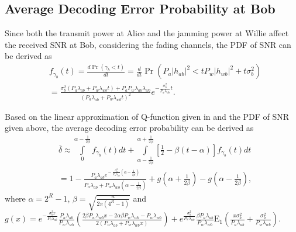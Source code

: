 \documentclass[conference]{IEEEtran}
\begin{document}
\subsection{Average Decoding Error Probability at Bob}
Since both the transmit power at Alice and the jamming power at Willie affect the received SNR at Bob, considering the fading channels, the PDF of SNR can be derived as
\begin{equation}
	\begin{aligned}
		 &{f_{{\gamma _b}}}\!(t)\!\!=\!\! \frac{{d\Pr \!\left(\! {{\gamma _b} \!\!<\! t} \right)}}{{dt}} \!\!=\!\! \frac{d}{{dt}}\Pr \!\left(\! {{P_a}{{\left| {{h_{ab}}} \right|}^2} \!\!<\! t{P_w}{{\left| {{h_{wb}}} \right|}^2} \!\!+\! t\sigma _b^2} \!\right)\!\\
		& = \frac{{\sigma _b^2({P_a}{\lambda _{ab}} + {P_w}{\lambda _{wb}}t) + {P_a}{P_w}{\lambda _{ab}}{\lambda _{wb}}}}{{{{({P_a}{\lambda _{ab}} + {P_w}{\lambda _{wb}}t)}^2}}}{e^{ - \frac{{\sigma _b^2}}{{{P_a}{\lambda _{ab}}}}t}}.
	\end{aligned}
\end{equation}


Based on the linear approximation of Q-function given in \cite{ECT2} and the PDF of SNR given above, the average decoding error probability can be derived as
\begin{equation}\label{Pe}
	\begin{aligned}
		&\overline \delta  \! \approx\!\!\!\! \int\limits_0^{\alpha  - \frac{1}{{2\beta }}}\!\!\!\! {{f_{{\gamma _b}}}\left( t \right)dt}  \!+\!\!\!\!\! \int\limits_{\alpha  - \frac{1}{{2\beta }}}^{\alpha  + \frac{1}{{2\beta }}} {\!\!\left[ {\frac{1}{2} \!-\! \beta \left( {t \!-\! \alpha } \right)} \right]} {f_{{\gamma _b}}}\left( t \right)dt\\
		&\!=\! 1 \!\!-\!\! \frac{{{P_a}{\lambda _{ab}}{e^{ \!-\! \frac{{\sigma _b^2}}{{{P_a}{\lambda _{ab}}}}\left( {\alpha  - \frac{1}{{2\beta }}} \right)}}}}{{{P_a}{\lambda _{ab}} \!+\! {P_w}{\lambda _{wb}}\!\left(\! {\alpha  \!-\! \frac{1}{{2\beta }}} \!\right)\!}} \!+\! g(\alpha  \!+\! \frac{1}{{2\beta }}) \!-\! g(\alpha  \!-\! \frac{1}{{2\beta }}),
	\end{aligned}
\end{equation}
where $\alpha  \!=\! {2^R} \!-\! 1$, $\beta  \!=\! \sqrt {\frac{n}{{2\pi \left( {{4^{R}} - 1} \right)}}} $ and $g(x) = {e^{ - \frac{{\sigma _b^2x}}{{{P_a}{\lambda _{ab}}}}}}\frac{{{P_a}{\lambda _{ab}}}}{{{P_w}{\lambda _{wb}}}}\left( {\frac{{2\beta {P_w}{\lambda _{wb}}x - 2\alpha \beta {P_w}{\lambda _{wb}} - {P_w}{\lambda _{wb}}}}{{2({P_a}{\lambda _{ab}} + {P_w}{\lambda _{wb}}x)}}} \right) + {e^{\frac{{\sigma _b^2}}{{{P_w}{\lambda _{wb}}}}}}\frac{{\beta {P_a}{\lambda _{ab}}}}{{{P_w}{\lambda _{wb}}}}{{\text{E}}_1}\left( {\frac{{x\sigma _b^2}}{{{P_a}{\lambda _{ab}}}} + \frac{{\sigma _b^2}}{{{P_w}{\lambda _{wb}}}}} \right)$.
\end{document}
